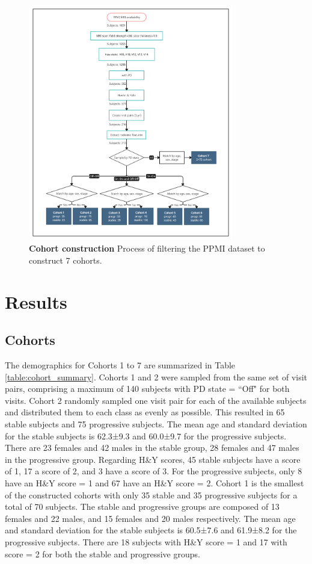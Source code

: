 \documentclass[10pt,letterpaper]{article}
\begin{document}
\begin{figure}[htbp]
  \includegraphics[width=0.8\textwidth]{images/Cohort7_flowchart.png}
  \caption{{\bf Cohort construction} Process of filtering the PPMI dataset to construct 7 cohorts.}
  \label{cohortCreationFlowchart}
\end{figure}

\section*{Results}

\subsection*{Cohorts}

The demographics for Cohorts 1 to 7 are summarized in Table \ref{table:cohort_summary}. Cohorts 1 and 2 were sampled from the same set of visit pairs, comprising a 
maximum of 140 subjects with PD state = ``Off" for both visits. Cohort 2 randomly sampled one visit pair for each of the available subjects and 
distributed them to each class as evenly as possible. This resulted in 65 stable subjects and 75 progressive subjects. The mean age and standard deviation for the stable subjects 
is 62.3±9.3 and 60.0±9.7 for the progressive subjects. There are 23 females and 42 males in the stable group, 28 females and 47 males in the progressive group. 
Regarding H\&Y scores, 45 stable subjects have a score of 1, 17 a score of 2, and 3 have a score of 3. For the progressive subjects, only 8 have an H\&Y 
score = 1 and 67 have an H\&Y score = 2. Cohort 1 is the smallest of the constructed cohorts with only 35 stable and 35 progressive subjects for a total of 70 
subjects. The stable and progressive groups are composed of 13 females and 22 males, and 15 females and 20 males respectively. The mean age and standard deviation for the stable 
subjects is 60.5±7.6 and 61.9±8.2 for the progressive subjects. There are 18 subjects with H\&Y score = 1 and 17 with score = 2 for both the stable and progressive 
groups.
\end{document}
